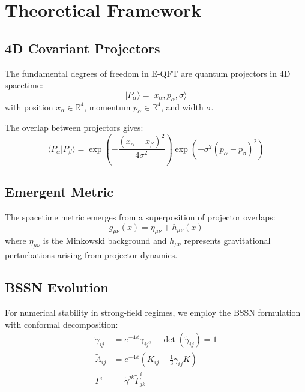 \documentclass[11pt,a4paper]{article}
\begin{document}
\section{Theoretical Framework}

\subsection{4D Covariant Projectors}

The fundamental degrees of freedom in E-QFT are quantum projectors in 4D spacetime:
\begin{equation}
|P_\alpha\rangle = |x_\alpha, p_\alpha, \sigma\rangle
\end{equation}
with position $x_\alpha \in \mathbb{R}^4$, momentum $p_\alpha \in \mathbb{R}^4$, and width $\sigma$.

The overlap between projectors gives:
\begin{equation}
\langle P_\alpha | P_\beta \rangle = \exp\left(-\frac{(x_\alpha - x_\beta)^2}{4\sigma^2}\right) \exp\left(-\sigma^2(p_\alpha - p_\beta)^2\right)
\end{equation}

\subsection{Emergent Metric}

The spacetime metric emerges from a superposition of projector overlaps:
\begin{equation}
g_{\mu\nu}(x) = \eta_{\mu\nu} + h_{\mu\nu}(x)
\end{equation}
where $\eta_{\mu\nu}$ is the Minkowski background and $h_{\mu\nu}$ represents gravitational perturbations arising from projector dynamics.

\subsection{BSSN Evolution}

For numerical stability in strong-field regimes, we employ the BSSN formulation \cite{Shibata1995,Baumgarte1999} with conformal decomposition:
\begin{align}
\tilde{\gamma}_{ij} &= e^{-4\phi} \gamma_{ij}, \quad \det(\tilde{\gamma}_{ij}) = 1 \\
\tilde{A}_{ij} &= e^{-4\phi} \left(K_{ij} - \frac{1}{3}\gamma_{ij}K\right) \\
\Gamma^i &= \tilde{\gamma}^{jk} \tilde{\Gamma}^i_{jk}
\end{align}
\end{document}
